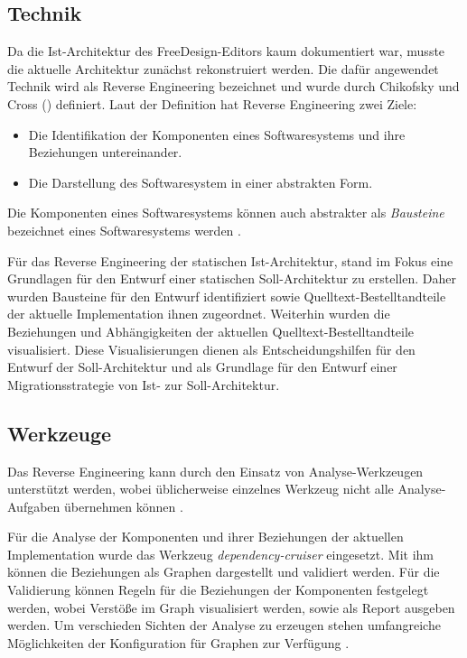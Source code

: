 \subsection{Technik}
Da die Ist-Architektur des FreeDesign-Editors kaum dokumentiert war, musste die aktuelle Architektur zunächst rekonstruiert werden. 
Die dafür angewendet Technik wird als Reverse Engineering bezeichnet und wurde durch Chikofsky und Cross (\citeyear[S. 13-17]{Chikofsky1990}) definiert. Laut der Definition hat Reverse Engineering zwei Ziele: 
\begin{itemize}
    \item Die Identifikation der Komponenten eines Softwaresystems und ihre Beziehungen untereinander. 
    \item Die Darstellung des Softwaresystem in einer abstrakten Form. 
\end{itemize}

Die Komponenten eines Softwaresystems können auch abstrakter als \emph{Bausteine} bezeichnet eines Softwaresystems werden \autocite[vgl.][24]{Starke2011}. 

Für das Reverse Engineering der statischen Ist-Architektur, stand im Fokus eine Grundlagen für den Entwurf einer statischen Soll-Architektur zu erstellen. Daher wurden Bausteine für den Entwurf identifiziert sowie Quelltext-Bestelltandteile der aktuelle Implementation ihnen zugeordnet. Weiterhin wurden die Beziehungen und Abhängigkeiten der aktuellen Quelltext-Bestelltandteile visualisiert. Diese Visualisierungen dienen als Entscheidungshilfen für den Entwurf der Soll-Architektur und als Grundlage für den Entwurf einer Migrationsstrategie von Ist- zur Soll-Architektur.

\subsection{Werkzeuge}
Das Reverse Engineering kann durch den Einsatz von Analyse-Werkzeugen unterstützt werden, wobei üblicherweise einzelnes Werkzeug nicht alle Analyse-Aufgaben übernehmen können \autocite[vgl.][381]{Bass2013}. 

Für die Analyse der Komponenten und ihrer Beziehungen der aktuellen Implementation wurde das Werkzeug \emph{dependency-cruiser} eingesetzt. Mit ihm können die Beziehungen als Graphen dargestellt und validiert werden. Für die Validierung können Regeln für die Beziehungen der Komponenten festgelegt werden, wobei Verstöße im Graph visualisiert werden, sowie als Report ausgeben werden. Um verschieden Sichten der Analyse zu erzeugen stehen umfangreiche Möglichkeiten der Konfiguration für Graphen zur Verfügung \autocite[vgl.][]{Verweij:Dependency}.

